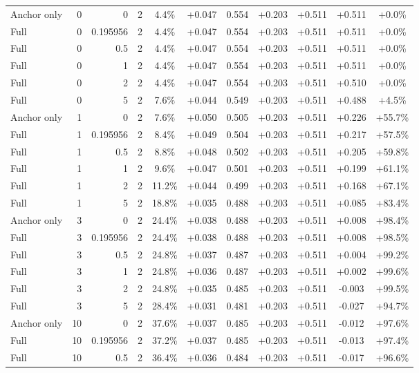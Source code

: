 \begin{table}[htbp]
\begin{tabular}{lrrrccccccc}
Anchor only & 0 & 0 & 2 & 4.4\% & +0.047 & 0.554 & +0.203 & +0.511 & +0.511 & +0.0\% \\
Full & 0 & 0.195956 & 2 & 4.4\% & +0.047 & 0.554 & +0.203 & +0.511 & +0.511 & +0.0\% \\
Full & 0 & 0.5 & 2 & 4.4\% & +0.047 & 0.554 & +0.203 & +0.511 & +0.511 & +0.0\% \\
Full & 0 & 1 & 2 & 4.4\% & +0.047 & 0.554 & +0.203 & +0.511 & +0.511 & +0.0\% \\
Full & 0 & 2 & 2 & 4.4\% & +0.047 & 0.554 & +0.203 & +0.511 & +0.510 & +0.0\% \\
Full & 0 & 5 & 2 & 7.6\% & +0.044 & 0.549 & +0.203 & +0.511 & +0.488 & +4.5\% \\
Anchor only & 1 & 0 & 2 & 7.6\% & +0.050 & 0.505 & +0.203 & +0.511 & +0.226 & +55.7\% \\
Full & 1 & 0.195956 & 2 & 8.4\% & +0.049 & 0.504 & +0.203 & +0.511 & +0.217 & +57.5\% \\
Full & 1 & 0.5 & 2 & 8.8\% & +0.048 & 0.502 & +0.203 & +0.511 & +0.205 & +59.8\% \\
Full & 1 & 1 & 2 & 9.6\% & +0.047 & 0.501 & +0.203 & +0.511 & +0.199 & +61.1\% \\
Full & 1 & 2 & 2 & 11.2\% & +0.044 & 0.499 & +0.203 & +0.511 & +0.168 & +67.1\% \\
Full & 1 & 5 & 2 & 18.8\% & +0.035 & 0.488 & +0.203 & +0.511 & +0.085 & +83.4\% \\
Anchor only & 3 & 0 & 2 & 24.4\% & +0.038 & 0.488 & +0.203 & +0.511 & +0.008 & +98.4\% \\
Full & 3 & 0.195956 & 2 & 24.4\% & +0.038 & 0.488 & +0.203 & +0.511 & +0.008 & +98.5\% \\
Full & 3 & 0.5 & 2 & 24.8\% & +0.037 & 0.487 & +0.203 & +0.511 & +0.004 & +99.2\% \\
Full & 3 & 1 & 2 & 24.8\% & +0.036 & 0.487 & +0.203 & +0.511 & +0.002 & +99.6\% \\
Full & 3 & 2 & 2 & 24.8\% & +0.035 & 0.485 & +0.203 & +0.511 & -0.003 & +99.5\% \\
Full & 3 & 5 & 2 & 28.4\% & +0.031 & 0.481 & +0.203 & +0.511 & -0.027 & +94.7\% \\
Anchor only & 10 & 0 & 2 & 37.6\% & +0.037 & 0.485 & +0.203 & +0.511 & -0.012 & +97.6\% \\
Full & 10 & 0.195956 & 2 & 37.2\% & +0.037 & 0.485 & +0.203 & +0.511 & -0.013 & +97.4\% \\
Full & 10 & 0.5 & 2 & 36.4\% & +0.036 & 0.484 & +0.203 & +0.511 & -0.017 & +96.6\% \\

\end{tabular}
\end{table}
